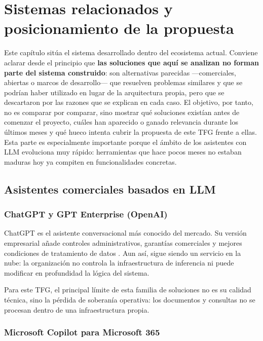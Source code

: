 \chapter[Sistemas relacionados]{Sistemas relacionados y posicionamiento de la propuesta}
\label{cap:sistemas}

Este capítulo sitúa el sistema desarrollado dentro del ecosistema actual. Conviene aclarar desde el principio que \textbf{las soluciones que aquí se analizan no forman parte del sistema construido}: son alternativas parecidas ---comerciales, abiertas o marcos de desarrollo--- que resuelven problemas similares y que se podrían haber utilizado en lugar de la arquitectura propia, pero que se descartaron por las razones que se explican en cada caso. El objetivo, por tanto, no es comparar por comparar, sino mostrar qué soluciones existían antes de comenzar el proyecto, cuáles han aparecido o ganado relevancia durante los últimos meses y qué hueco intenta cubrir la propuesta de este TFG frente a ellas. Esta parte es especialmente importante porque el ámbito de los asistentes con LLM evoluciona muy rápido: herramientas que hace pocos meses no estaban maduras hoy ya compiten en funcionalidades concretas.

\section{Asistentes comerciales basados en LLM}

\subsection{ChatGPT y GPT Enterprise (OpenAI)}

ChatGPT es el asistente conversacional más conocido del mercado. Su versión empresarial añade controles administrativos, garantías comerciales y mejores condiciones de tratamiento de datos \cite{openaiChatgptEnterprise2026}. Aun así, sigue siendo un servicio en la nube: la organización no controla la infraestructura de inferencia ni puede modificar en profundidad la lógica del sistema.

Para este TFG, el principal límite de esta familia de soluciones no es su calidad técnica, sino la pérdida de soberanía operativa: los documentos y consultas no se procesan dentro de una infraestructura propia.

\subsection{Microsoft Copilot para Microsoft 365}

